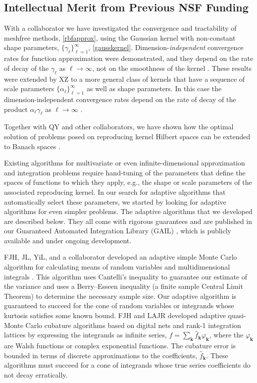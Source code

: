 \documentclass[11pt]{NSFamsart}
\newcommand{\hatf}{\hat{f}}
\newcommand{\bk}{{\boldsymbol{k}}}
\begin{document}
\subsection{Intellectual Merit from Previous NSF Funding}
\label{previousmeritsubsec}

With a collaborator we have investigated the convergence and tractability of meshfree methods, \eqref{rbfapprox}, using the Gaussian kernel with non-constant shape parameters, $\{\gamma_{\ell}\}_{\ell =1}^{\infty}$, \eqref{gausskernel}. Dimension-\emph{independent} convergence rates for function approximation were demonstrated, and they depend on the rate of decay of the $\gamma_{\ell}$ as $\ell \to \infty$, not on the smoothness of the kernel \citep{FasHicWoz12b, FasHicWoz12a}. These results were extended by XZ to a more general class of kernels that have a sequence of scale parameters $\{\alpha_{\ell}\}_{\ell=1}^{\infty}$ as well as shape parameters.  In this case the dimension-independent convergence rates depend on the rate of decay of the product $\alpha_{\ell} \gamma_{\ell}$ as $\ell \to \infty$ \citep{ZhoHic15a}.

Together with QY and other collaborators, we have shown how the optimal solution of problems posed on reproducing kernel Hilbert spaces can be extended to Banach spaces \citep{FasHicYe13a,SonZhaHic12a}.

Existing algorithms for multivariate or even infinite-dimensional approximation and integration problems require hand-tuning of the parameters that define the spaces of functions to which they apply, e.g., the shape or scale parameters of the associated reproducing kernel.  In our search for adaptive algorithms that automatically select these parameters, we started by looking for adaptive algorithms for even simpler problems. The adaptive algorithms that we developed are described below.  They all come with rigorous guarantees and are published in our Guaranteed Automated Integration Library (GAIL) \citep{ChoEtal14a}, which is publicly available and under ongoing development.

FJH, JL, YiL, and a collaborator developed an adaptive simple Monte Carlo algorithm for calculating means of random variables and multidimensional integrals \citep{HicEtal14a}.  This algorithm uses Cantelli's inequality to guarantee our estimate of the variance and uses a Berry--Esseen inequality (a finite sample Central Limit Theorem) to determine the necessary sample size.  Our adaptive algorithm is guaranteed to succeed for the cone of random variables or integrands whose kurtosis satisfies some known bound.  FJH and LAJR developed adaptive quasi-Monte Carlo cubature algorithms based on digital nets \citep{HicJim16a} and rank-1 integration lattices \citep{JimHic16a} by expressing the integrands as infinite series, $f=\sum_{\bk} \hatf_\bk \varphi_{\bk}$, where the $\varphi_{\bk}$ are Walsh functions or complex exponential functions.  The cubature error is bounded in terms of discrete  approximations to the coefficients, $\hatf_\bk$.  These algorithms must succeed for a cone of integrands whose true series coefficients do not decay erratically.
\end{document}
